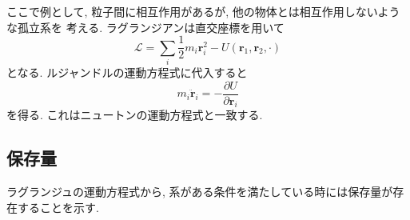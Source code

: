 ここで例として, 粒子間に相互作用があるが, 他の物体とは相互作用しないような孤立系を
考える.
ラグランジアンは直交座標を用いて
\begin{equation}
 \mathcal{L}
=\sum_{i} \frac{1}{2} m_{i} \bm{r}_{i}^{2}
-U(\bm{r}_{1}, \bm{r}_{2}, \cdot)
\end{equation}
となる. ルジャンドルの運動方程式に代入すると
\begin{equation}
 m_{i} \ddot{\bm{r}}_{i} = - \frac{\partial U}{\partial \bm{r}_{i}}
\end{equation}
を得る.
これはニュートンの運動方程式と一致する.

\subsection{保存量}
ラグランジュの運動方程式から, 系がある条件を満たしている時には保存量が存在することを示す.


